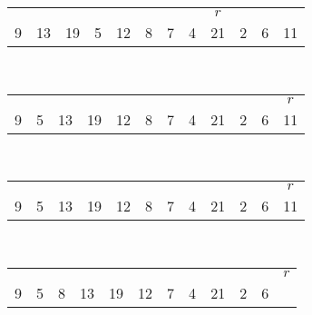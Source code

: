 \documentclass[addpoints,11pt]{exam}
\begin{document}
\begin{questions}
\begin{solutionorbox}
\begin{tabular}{|c|c|c|c|c|c|c|c|c|c|c|c|}
				\multicolumn{1}{c}{}&
				\multicolumn{1}{c}{}&
				\multicolumn{1}{c}{}&
				\multicolumn{1}{c}{}&
				\multicolumn{1}{c}{}&
				\multicolumn{1}{c}{}&
				\multicolumn{1}{c}{}&
				\multicolumn{1}{c}{}&
				\multicolumn{1}{c}{$r$}\\
				\cellcolor{lightred}9&
				\cellcolor{lightred}13&
				\cellcolor{lightred}19&
				5&
				12&
				8&
				7&
				4&
				21&
				2&
				6&
				11
			\end{tabular}\\
			\begin{tabular}{|c|c|c|c|c|c|c|c|c|c|c|c|}
				\multicolumn{1}{c}{}&
				\multicolumn{1}{c}{}&
				\multicolumn{1}{c}{}&
				\multicolumn{1}{c}{}&
				\multicolumn{1}{c}{}&
				\multicolumn{1}{c}{}&
				\multicolumn{1}{c}{}&
				\multicolumn{1}{c}{}&
				\multicolumn{1}{c}{}&
				\multicolumn{1}{c}{}&
				\multicolumn{1}{c}{}&
				\multicolumn{1}{c}{$r$}\\
				\cellcolor{lightred}9&
				\cellcolor{lightred}5&
				\cellcolor{lightred}13&
				\cellcolor{lightred}19&
				12&
				8&
				7&
				4&
				21&
				2&
				6&
				11
			\end{tabular}\\
			\begin{tabular}{|c|c|c|c|c|c|c|c|c|c|c|c|}
				\multicolumn{1}{c}{}&
				\multicolumn{1}{c}{}&
				\multicolumn{1}{c}{}&
				\multicolumn{1}{c}{}&
				\multicolumn{1}{c}{}&
				\multicolumn{1}{c}{}&
				\multicolumn{1}{c}{}&
				\multicolumn{1}{c}{}&
				\multicolumn{1}{c}{}&
				\multicolumn{1}{c}{}&
				\multicolumn{1}{c}{}&
				\multicolumn{1}{c}{$r$}\\
				\cellcolor{lightred}9&
				\cellcolor{lightred}5&
				\cellcolor{lightred}13&
				\cellcolor{lightred}19&
				\cellcolor{lightred}12&
				8&
				7&
				4&
				21&
				2&
				6&
				11
			\end{tabular}\\
			\begin{tabular}{|c|c|c|c|c|c|c|c|c|c|c|c|}
				\multicolumn{1}{c}{}&
				\multicolumn{1}{c}{}&
				\multicolumn{1}{c}{}&
				\multicolumn{1}{c}{}&
				\multicolumn{1}{c}{}&
				\multicolumn{1}{c}{}&
				\multicolumn{1}{c}{}&
				\multicolumn{1}{c}{}&
				\multicolumn{1}{c}{}&
				\multicolumn{1}{c}{}&
				\multicolumn{1}{c}{}&
				\multicolumn{1}{c}{$r$}\\
				\cellcolor{lightred}9&
				\cellcolor{lightred}5&
				\cellcolor{lightred}8&
				\cellcolor{lightred}13&
				\cellcolor{lightred}19&
				\cellcolor{lightred}12&
				7&
				4&
				21&
				2&
				6&

\end{tabular}
\end{solutionorbox}
\end{questions}
\end{document}
